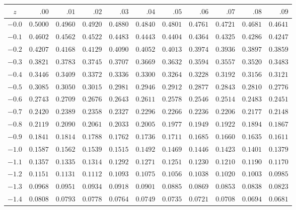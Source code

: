\documentclass[11pt]{article}
\begin{document}
\vspace{0.2cm}
\small
\setlength{\tabcolsep}{7pt}
\renewcommand{\arraystretch}{1.25}
\begin{tabular}{c*{10}{r}}
\toprule
$z$ & $.00$ & $.01$ & $.02$ & $.03$ & $.04$ & $.05$ & $.06$ & $.07$ & $.08$ & $.09$ \\
\midrule
$-0.0$ & $0.5000$ & $0.4960$ & $0.4920$ & $0.4880$ & $0.4840$ & $0.4801$ & $0.4761$ & $0.4721$ & $0.4681$ & $0.4641$ \\
$-0.1$ & $0.4602$ & $0.4562$ & $0.4522$ & $0.4483$ & $0.4443$ & $0.4404$ & $0.4364$ & $0.4325$ & $0.4286$ & $0.4247$ \\
$-0.2$ & $0.4207$ & $0.4168$ & $0.4129$ & $0.4090$ & $0.4052$ & $0.4013$ & $0.3974$ & $0.3936$ & $0.3897$ & $0.3859$ \\
$-0.3$ & $0.3821$ & $0.3783$ & $0.3745$ & $0.3707$ & $0.3669$ & $0.3632$ & $0.3594$ & $0.3557$ & $0.3520$ & $0.3483$ \\
$-0.4$ & $0.3446$ & $0.3409$ & $0.3372$ & $0.3336$ & $0.3300$ & $0.3264$ & $0.3228$ & $0.3192$ & $0.3156$ & $0.3121$ \\
$-0.5$ & $0.3085$ & $0.3050$ & $0.3015$ & $0.2981$ & $0.2946$ & $0.2912$ & $0.2877$ & $0.2843$ & $0.2810$ & $0.2776$ \\
$-0.6$ & $0.2743$ & $0.2709$ & $0.2676$ & $0.2643$ & $0.2611$ & $0.2578$ & $0.2546$ & $0.2514$ & $0.2483$ & $0.2451$ \\
$-0.7$ & $0.2420$ & $0.2389$ & $0.2358$ & $0.2327$ & $0.2296$ & $0.2266$ & $0.2236$ & $0.2206$ & $0.2177$ & $0.2148$ \\
$-0.8$ & $0.2119$ & $0.2090$ & $0.2061$ & $0.2033$ & $0.2005$ & $0.1977$ & $0.1949$ & $0.1922$ & $0.1894$ & $0.1867$ \\
$-0.9$ & $0.1841$ & $0.1814$ & $0.1788$ & $0.1762$ & $0.1736$ & $0.1711$ & $0.1685$ & $0.1660$ & $0.1635$ & $0.1611$ \\
$-1.0$ & $0.1587$ & $0.1562$ & $0.1539$ & $0.1515$ & $0.1492$ & $0.1469$ & $0.1446$ & $0.1423$ & $0.1401$ & $0.1379$ \\
$-1.1$ & $0.1357$ & $0.1335$ & $0.1314$ & $0.1292$ & $0.1271$ & $0.1251$ & $0.1230$ & $0.1210$ & $0.1190$ & $0.1170$ \\
$-1.2$ & $0.1151$ & $0.1131$ & $0.1112$ & $0.1093$ & $0.1075$ & $0.1056$ & $0.1038$ & $0.1020$ & $0.1003$ & $0.0985$ \\
$-1.3$ & $0.0968$ & $0.0951$ & $0.0934$ & $0.0918$ & $0.0901$ & $0.0885$ & $0.0869$ & $0.0853$ & $0.0838$ & $0.0823$ \\
$-1.4$ & $0.0808$ & $0.0793$ & $0.0778$ & $0.0764$ & $0.0749$ & $0.0735$ & $0.0721$ & $0.0708$ & $0.0694$ & $0.0681$ \\

\end{tabular}
\end{document}
